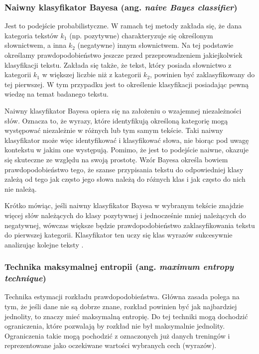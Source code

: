 \subsubsection{Naiwny klasyfikator Bayesa (ang. \textit{naive Bayes classifier})}
Jest to podejście probabilistyczne. W ramach tej metody zakłada się, że dana kategoria
tekstów $k_1$ (np. pozytywne) charakteryzuje się określonym słownictwem, 
a inna $k_2$ (negatywne) innym słownictwem. 
Na tej podstawie określamy prawdopodobieństwo jeszcze przed przeprowadzeniem
jakiejkolwiek klasyfikacji tekstu. Zakłada się także, że tekst, który posiada
słownictwo z kategorii $k_1$ w większej liczbie niż z kategorii $k_2$, powinien
być zaklasyfikowany do tej pierwszej. 
W tym przypadku jest to określenie klasyfikacji posiadając pewną wiedzę na temat
badanego tekstu.

Naiwny klasyfikator Bayesa opiera się na założeniu o wzajemnej niezależności
słów. Oznacza to, że wyrazy, które identyfikują określoną kategorię mogą występować
niezależnie w różnych lub tym samym tekście. Taki naiwny klasyfikator może więc 
identyfikować i klasyfikować słowa, nie biorąc pod uwagę kontekstu w jakim one
występują. Pomimo, że jest to podejście naiwne, okazuje się skuteczne ze względu
na swoją prostotę. Wzór Bayesa określa bowiem prawdopodobieństwo tego, że szanse
przypisania tekstu do odpowiedniej klasy zależą od tego jak często jego słowa
należą do różnych klas i jak często do nich nie należą.

Krótko mówiąc, jeśli naiwny klasyfikator Bayesa w wybranym tekście znajdzie więcej
słów należących do klasy pozytywnej i jednocześnie mniej należących do negatywnej,
wówczas większe będzie prawdopodobieństwo zaklasyfikowania tekstu do pierwszej
kategorii. Klasyfikator ten uczy się klas wyrazów sukcesywnie analizując
kolejne teksty \cite{tomanekSentyment}.



\subsubsection{Technika maksymalnej entropii (ang. \textit{maximum entropy technique})}
Technika estymacji rozkładu prawdopodobieństwa. Główna zasada polega na tym,
że jeśli dane nie są dobrze znane, rozkład powinien być jak najbardziej jednolity,
to znaczy mieć maksymalną entropię. Do tej techniki mogą dochodzić ograniczenia,
które pozwalają by rozkład nie był maksymalnie jednolity. Ograniczenia
takie mogą pochodzić z oznaczonych już danych treningów i reprezentowane jako
oczekiwane wartości wybranych cech (wyrazów). 

